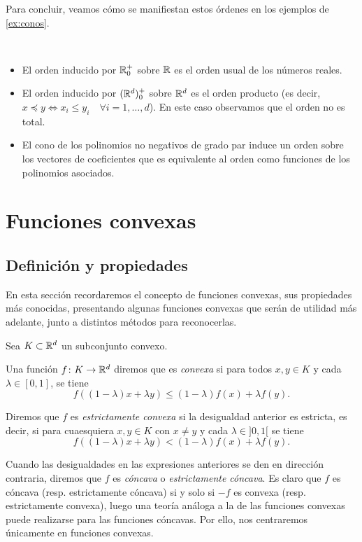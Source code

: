 Para concluir, veamos cómo se manifiestan estos órdenes en los ejemplos de \ref{ex:conos}.
\begin{example}~
    \begin{itemize}
        \item El orden inducido por $\mathbb{R}^+_0$ sobre $\mathbb{R}$ es el orden usual de los números reales.
        \item El orden inducido por $(\mathbb{R}^d)^+_0$ sobre $\mathbb{R}^d$ es el orden producto (es decir, $x \preceq y \iff x_i \le y_i \quad \forall i=1,\dots,d$). En este caso observamos que el orden no es total.
        \item El cono de los polinomios no negativos de grado par induce un orden sobre los vectores de coeficientes que es equivalente al orden como funciones de los polinomios asociados.
\end{itemize}
\end{example}

\section{Funciones convexas}

\subsection{Definición y propiedades}

En esta sección recordaremos el concepto de funciones convexas, sus propiedades más conocidas, presentando algunas funciones convexas que serán de utilidad más adelante, junto a distintos métodos para reconocerlas.

\begin{definition}
    Sea $K \subset \mathbb{R}^d$ un subconjunto convexo. 

    Una función $f \colon K \to \mathbb{R}^d$ diremos que es \emph{convexa} si para todos $x,y \in K$ y cada $\lambda \in [0,1]$, se tiene
    \[f((1-\lambda)x+\lambda y) \le (1-\lambda) f(x) + \lambda f(y). \]

    Diremos que $f$ es \emph{estrictamente convexa} si la desigualdad anterior es estricta, es decir, si para cuaesquiera $x,y \in K$ con $x\ne y$ y cada $\lambda \in ]0,1[$ se tiene
    \[f((1-\lambda)x+\lambda y) < (1-\lambda)f(x) + \lambda f(y). \]

    Cuando las desigualdades en las expresiones anteriores se den en dirección contraria, diremos que $f$ es \emph{cóncava} o \emph{estrictamente cóncava}. Es claro que $f$ es cóncava (resp. estrictamente cóncava) si y solo si $-f$ es convexa (resp. estrictamente convexa), luego una teoría análoga a la de las funciones convexas puede realizarse para las funciones cóncavas. Por ello, nos centraremos únicamente en funciones convexas.
\end{definition}

